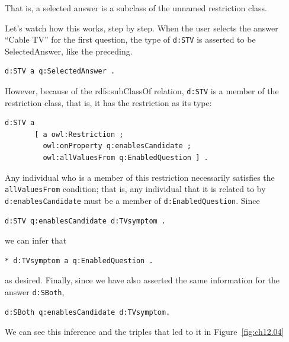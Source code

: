 That is, a selected answer is a subclass of the unnamed restriction
class.

Let's watch how this works, step by step. When the user selects the
answer ``Cable TV'' for the first question, the type of \texttt{d:STV} is
asserted to be SelectedAnswer, like the preceding.

\begin{lstlisting}
d:STV a q:SelectedAnswer .
\end{lstlisting}

However, because of the rdfs:subClassOf relation, \texttt{d:STV} is a member of
the restriction class, that is, it has the restriction as its type:

\begin{lstlisting}
d:STV a
       [ a owl:Restriction ;
         owl:onProperty q:enablesCandidate ;
         owl:allValuesFrom q:EnabledQuestion ] .
\end{lstlisting}

Any individual who is a member of this restriction necessarily satisfies
the \texttt{allValuesFrom} condition; that is, any individual that it is related
to by
\texttt{d:enablesCandidate} must be a member of \texttt{d:EnabledQuestion}. Since

\begin{lstlisting}
d:STV q:enablesCandidate d:TVsymptom .
\end{lstlisting}

we can infer that

\begin{lstlisting}
* d:TVsymptom a q:EnabledQuestion .
\end{lstlisting}

as desired. Finally, since we have also asserted the same information
for the answer \texttt{d:SBoth},

\begin{lstlisting}
d:SBoth q:enablesCandidate d:TVsymptom.
\end{lstlisting}

We can see this inference and the triples that led to it in Figure~\ref{fig:ch12.04}


